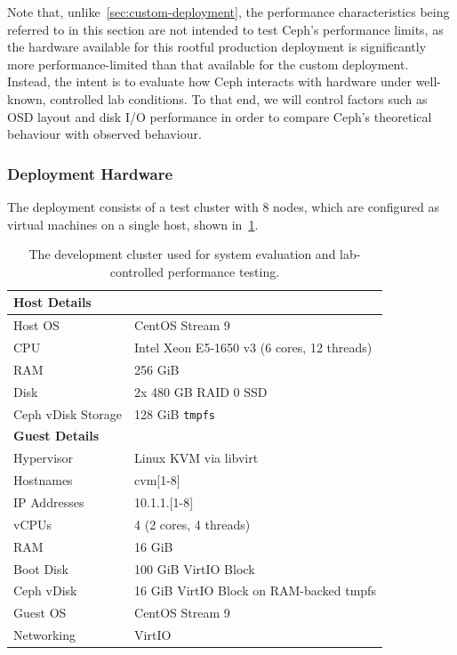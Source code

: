 Note that, unlike~\cref{sec:custom-deployment}, the performance characteristics being referred to in this section are not intended to test Ceph's performance limits, as the hardware available for this rootful production deployment is significantly more performance-limited than that available for the custom deployment. Instead, the intent is to evaluate how Ceph interacts with hardware under well-known, controlled lab conditions. To that end, we will control factors such as \ac{OSD} layout and disk \ac{I/O} performance in order to compare Ceph's theoretical behaviour with observed behaviour.

\subsubsection{Deployment Hardware}

The deployment consists of a test cluster with 8 nodes, which are configured as
virtual machines on a single host, shown in~\cref{tab:dev-cluster}.

\begin{table}[h!]
    \centering
    \begin{tabular}{|ll|}
        \hline
        \multicolumn{2}{|l|}{\textbf{Host Details}} \\
        \hline
        Host \ac{OS}        & Cent\acs{OS} Stream 9 \\
        \ac{CPU}            & Intel Xeon E5-1650 v3 (6 cores, 12 threads) \\
        \ac{RAM}            & 256 GiB \\
        Disk                & 2x 480 GB \acs{RAID} 0 \ac{SSD} \\
        Ceph vDisk Storage  & 128 GiB \texttt{tmpfs} \\
        \hline
        \multicolumn{2}{|l|}{\textbf{Guest Details}} \\
        \hline
        Hypervisor          & Linux KVM via libvirt \\
        Hostnames           & cvm[1-8] \\
        \acs{IP} Addresses  & 10.1.1.[1-8] \\
        v\acs{CPU}s         & 4 (2 cores, 4 threads) \\
        \acs{RAM}           & 16 GiB \\
        Boot Disk           & 100 GiB Virt\acs{IO} Block \\
        Ceph vDisk          & 16 GiB Virt\acs{IO} Block on \acs{RAM}-backed tmpfs \\
        Guest \acs{OS}      & Cent\acs{OS} Stream 9 \\
        Networking          & Virt\acs{IO} \\
        \hline
    \end{tabular}
    \caption[Development Cluster Hardware]{The development cluster used for system evaluation and lab-controlled performance testing.}
    \label{tab:dev-cluster}
\end{table}

